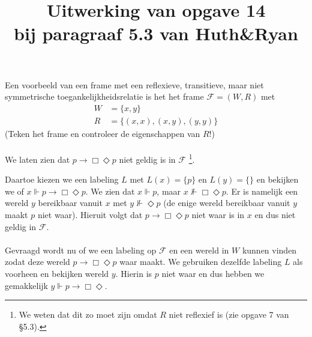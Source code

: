 \documentclass[a4paper,11pt]{article}
\title{Uitwerking van opgave 14\\
\normalsize{bij paragraaf 5.3 van Huth\&Ryan}}
\date{}
\begin{document}
\maketitle


Een voorbeeld van een frame met een reflexieve, transitieve, maar niet
symmetrische toegankelijkheidsrelatie is het het frame $\mathcal{F} = (W, R)$
met
\begin{align*}
W &= \{x, y\} \\
R &= \{(x, x), (x, y), (y, y)\}
\end{align*}
(Teken het frame en controleer de eigenschappen van $R$!)

\paragraph{}

We laten zien dat $p \rightarrow \Box \Diamond p$ niet geldig is in
$\mathcal{F}$ \footnote{We weten dat dit zo moet zijn omdat $R$ niet reflexief
is (zie opgave 7 van \S5.3).}.

Daartoe kiezen we een labeling $L$ met $L(x) = \{p\}$ en $L(y) = \{\}$ en
bekijken we of $x \Vdash p \rightarrow \Box \Diamond p$. We zien dat
$x \Vdash p$, maar $x \not \Vdash \Box \Diamond p$. Er is namelijk een wereld
$y$ bereikbaar vanuit $x$ met $y \not \Vdash \Diamond p$ (de enige wereld
bereikbaar vanuit $y$ maakt $p$ niet waar). Hieruit volgt dat
$p \rightarrow \Box \Diamond p$ niet waar is in $x$ en dus niet geldig in
$\mathcal{F}$.

\paragraph{}

Gevraagd wordt nu of we een labeling op $\mathcal{F}$ en een wereld in $W$
kunnen vinden zodat deze wereld $p \rightarrow \Box \Diamond p$ waar maakt. We
gebruiken dezelfde labeling $L$ als voorheen en bekijken wereld $y$. Hierin
is $p$ niet waar en dus hebben we gemakkelijk
$y \Vdash p \rightarrow \Box \Diamond$.
\end{document}
